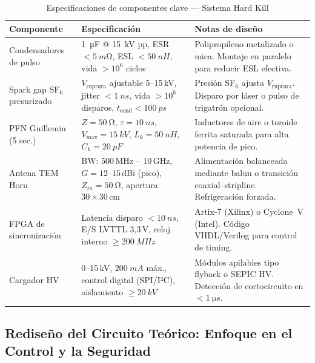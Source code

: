 \documentclass[12pt,a4paper]{article}
\begin{document}
\begin{table}[H]
\centering
\caption{Especificaciones de componentes clave — Sistema Hard Kill}
\label{tab:comp_hk}
\renewcommand{\arraystretch}{1.25}
\begin{tabularx}{\textwidth}{>{\hsize=0.8\hsize}X X X}
\toprule
\textbf{Componente} & \textbf{Especificación} & \textbf{Notas de diseño} \\
\midrule
Condensadores de pulso &
  \SI{1}{\micro F} @ \SI{15}{kV} pp,
  ESR $< \SI{5}{m\ohm}$, ESL $< \SI{50}{nH}$,
  vida $> 10^6$ ciclos &
  Polipropileno metalizado o mica. Montaje en paralelo para
  reducir ESL efectiva. \\[4pt]

Spark gap SF$_6$ presurizado &
  $V_\mathrm{ruptura}$ ajustable 5–15\,kV,
  jitter $< \SI{1}{ns}$,
  vida $> 10^6$ disparos,
  $t_\mathrm{cond} < \SI{100}{ps}$ &
  Presión SF$_6$ ajusta $V_\mathrm{ruptura}$.
  Disparo por láser o pulso de trigatrón opcional. \\[4pt]

PFN Guillemin (5 sec.) &
  $Z = \SI{50}{\ohm}$, $\tau = \SI{10}{ns}$,
  $V_\mathrm{max} = \SI{15}{kV}$,
  $L_k = \SI{50}{nH}$, $C_k = \SI{20}{pF}$ &
  Inductores de aire o toroide ferrita saturada para
  alta potencia de pico. \\[4pt]

Antena TEM Horn &
  BW: 500\,MHz – 10\,GHz,
  $G = 12$–$15$\,dBi (pico),
  $Z_{in} = \SI{50}{\ohm}$,
  apertura $30 \times 30$\,cm &
  Alimentación balanceada mediante balun o transición
  coaxial–stripline. Refrigeración forzada. \\[4pt]

FPGA de sincronización &
  Latencia disparo $< \SI{10}{ns}$,
  E/S LVTTL 3,3\,V,
  reloj interno $\geq \SI{200}{MHz}$ &
  Artix-7 (Xilinx) o Cyclone~V (Intel).
  Código VHDL/Verilog para control de timing. \\[4pt]

Cargador HV &
  0–15\,kV, $\SI{200}{mA}$ máx.,
  control digital (SPI/I²C),
  aislamiento $\geq \SI{20}{kV}$ &
  Módulos apilables tipo flyback o SEPIC HV.
  Detección de cortocircuito en $< \SI{1}{\micro s}$.\\
\bottomrule
\end{tabularx}
\end{table}

\subsection{Rediseño del Circuito Teórico: Enfoque en el Control y la Seguridad}
\end{document}
